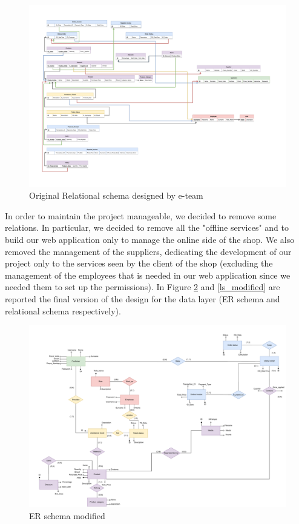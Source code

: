 \begin{figure}[H]
\centering
\includegraphics[width=\textwidth]{Schemas/LogicRS_original.drawio.pdf}
\caption{Original Relational schema designed by e-team}
\label{ls_original}
\end{figure}
\restoregeometry
In order to maintain the project manageable, we decided to remove some relations. In particular, we decided to remove all the "offline services" and to build our web application only to manage the online side of the shop.
We also removed the management of the suppliers, dedicating the development of our project only to the services seen by the client of the shop (excluding the management of the employees that is needed in our web application since we needed them to set up the permissions). In Figure \ref{er_modified} and \ref{ls_modified} are reported the final version of the design for the data layer (ER schema and relational schema respectively).

\begin{figure}[H]
\centering
\includegraphics[width=\textwidth]{Schemas/ER_modified.drawio.pdf}
\caption{ER schema modified}
\label{er_modified}
\end{figure}

